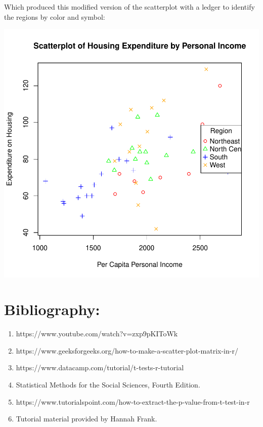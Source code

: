 \documentclass[12pt,letterpaper]{article}
\begin{document}
    Which produced this modified version of the scatterplot with a ledger to identify the regions by color and symbol:
\begin{center}
\includegraphics{Final_Scatter_Plot_Resized}
\end{center} 

\section*{Bibliography:}
\begin{enumerate}
	\item https://www.youtube.com/watch?v=zxp9pKIToWk
	\item https://www.geeksforgeeks.org/how-to-make-a-scatter-plot-matrix-in-r/
	\item https://www.datacamp.com/tutorial/t-tests-r-tutorial
	\item Statistical Methods for the Social Sciences, Fourth Edition.
	\item https://www.tutorialspoint.com/how-to-extract-the-p-value-from-t-test-in-r
	\item Tutorial material provided by Hannah Frank.
\end{enumerate}


     
     
     
\end{document}
